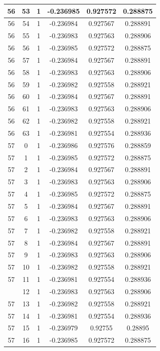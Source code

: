 \documentclass[12pt,a4paper]{article}
\numberwithin{equation}{section}
\numberwithin{figure}{section}
\numberwithin{table}{section}
\begin{document}
\begin{longtable}{|c|c|c|c|c|c|}
56 & 53 & 1 & -0.236985 & 0.927572 & 0.288875 \\ \hline
56 & 54 & 1 & -0.236984 & 0.927567 & 0.288891 \\ \hline
56 & 55 & 1 & -0.236983 & 0.927563 & 0.288906 \\ \hline
56 & 56 & 1 & -0.236985 & 0.927572 & 0.288875 \\ \hline
56 & 57 & 1 & -0.236984 & 0.927567 & 0.288891 \\ \hline
56 & 58 & 1 & -0.236983 & 0.927563 & 0.288906 \\ \hline
56 & 59 & 1 & -0.236982 & 0.927558 & 0.288921 \\ \hline
56 & 60 & 1 & -0.236984 & 0.927567 & 0.288891 \\ \hline
56 & 61 & 1 & -0.236983 & 0.927563 & 0.288906 \\ \hline
56 & 62 & 1 & -0.236982 & 0.927558 & 0.288921 \\ \hline
56 & 63 & 1 & -0.236981 & 0.927554 & 0.288936 \\ \hline
57 & 0 & 1 & -0.236986 & 0.927576 & 0.288859 \\ \hline
57 & 1 & 1 & -0.236985 & 0.927572 & 0.288875 \\ \hline
57 & 2 & 1 & -0.236984 & 0.927567 & 0.288891 \\ \hline
57 & 3 & 1 & -0.236983 & 0.927563 & 0.288906 \\ \hline
57 & 4 & 1 & -0.236985 & 0.927572 & 0.288875 \\ \hline
57 & 5 & 1 & -0.236984 & 0.927567 & 0.288891 \\ \hline
57 & 6 & 1 & -0.236983 & 0.927563 & 0.288906 \\ \hline
57 & 7 & 1 & -0.236982 & 0.927558 & 0.288921 \\ \hline
57 & 8 & 1 & -0.236984 & 0.927567 & 0.288891 \\ \hline
57 & 9 & 1 & -0.236983 & 0.927563 & 0.288906 \\ \hline
57 & 10 & 1 & -0.236982 & 0.927558 & 0.288921 \\ \hline
57 & 11 & 1 & -0.236981 & 0.927554 & 0.288936 \\ \hline
\pagebreak
57 & 12 & 1 & -0.236983 & 0.927563 & 0.288906 \\ \hline
57 & 13 & 1 & -0.236982 & 0.927558 & 0.288921 \\ \hline
57 & 14 & 1 & -0.236981 & 0.927554 & 0.288936 \\ \hline
57 & 15 & 1 & -0.236979 & 0.92755 & 0.28895 \\ \hline
57 & 16 & 1 & -0.236985 & 0.927572 & 0.288875 \\ \hline

\end{longtable}
\end{document}
